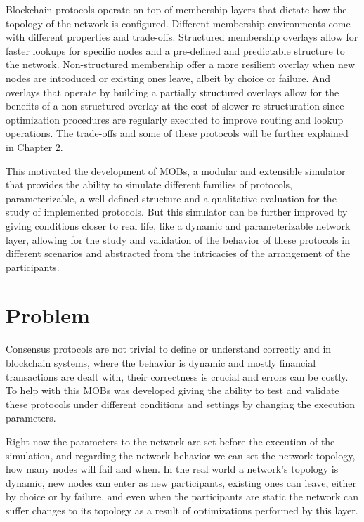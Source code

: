 Blockchain protocols operate on top of membership layers that dictate how the topology of the network is configured.
Different membership environments come with different properties and trade-offs. Structured membership overlays allow for faster lookups for
specific nodes and a pre-defined and predictable structure to the network. Non-structured membership offer a more resilient overlay when
new nodes are introduced or existing ones leave, albeit by choice or failure. And overlays that operate by building a partially structured
overlays allow for the benefits of a non-structured overlay at the cost of slower re-structuration since optimization
procedures are regularly executed to improve routing and lookup operations. The trade-offs and some of these protocols will be further
explained in Chapter 2.

This motivated the development of MOBs, a modular and extensible simulator that provides the ability to simulate different families of protocols, 
parameterizable, a well-defined structure and a qualitative evaluation for the study of implemented protocols. But this simulator can be further 
improved by giving conditions closer to real life, like a dynamic and parameterizable network layer, allowing for the study and validation of the
behavior of these protocols in different scenarios and abstracted from the intricacies of the arrangement of the participants.

\section{Problem}
\label{sub:problem}
Consensus protocols are not trivial to define or understand correctly and in blockchain systems, where the behavior is dynamic and mostly 
financial transactions are dealt with, their correctness is crucial and errors can be costly. To help with this MOBs was developed giving
the ability to test and validate these protocols under different conditions and settings by changing the execution parameters.

Right now the parameters to the network are set before the execution of the simulation, and regarding the network behavior we can
set the network topology, how many nodes will fail and when. In the real world a network's topology is dynamic, new nodes can enter
as new participants, existing ones can leave, either by choice or by failure, and even when the participants are static the network
can suffer changes to its topology as a result of optimizations performed by this layer.

